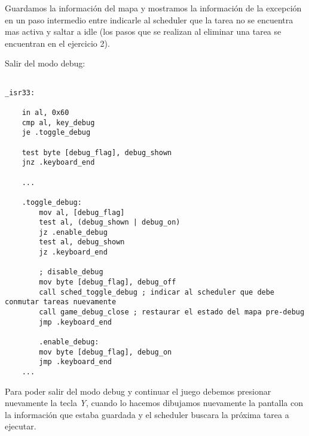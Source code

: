 	Guardamos la información del mapa y mostramos la información de la excepción en un paso intermedio entre indicarle al scheduler que la tarea no se encuentra mas activa y saltar a idle (los pasos que se realizan al eliminar una tarea se encuentran en el ejercicio 2).

	Salir del modo debug:

	\begin{lstlisting}

_isr33:

    in al, 0x60
    cmp al, key_debug
    je .toggle_debug

    test byte [debug_flag], debug_shown
    jnz .keyboard_end

    ...

    .toggle_debug:
        mov al, [debug_flag]
        test al, (debug_shown | debug_on)
        jz .enable_debug
        test al, debug_shown
        jz .keyboard_end

        ; disable_debug
        mov byte [debug_flag], debug_off
        call sched_toggle_debug ; indicar al scheduler que debe conmutar tareas nuevamente
        call game_debug_close ; restaurar el estado del mapa pre-debug
        jmp .keyboard_end

        .enable_debug:
        mov byte [debug_flag], debug_on
        jmp .keyboard_end
    ...
	\end{lstlisting}

	Para poder salir del modo debug y continuar el juego debemos presionar nuevamente la tecla \textit{Y}, cuando lo hacemos dibujamos nuevamente la pantalla con la información que estaba guardada y el scheduler buscara la próxima tarea a ejecutar.